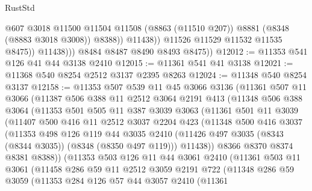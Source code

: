\begin{lexlean}{RustStd}
\begin{coremodule}
{\begin{coremodule}
{{{{{{{{{{{{{{{{{{{{{{{{{{{{{{{{{{{{{{{{{{{{{{{{{{                          @607
                          @3018
                          @11500
                          @11504
                          @11508
                          (@8863 (@11510 @207))
                          @8881
                          (@8348 (@8883 @3018 @3008))
                          @8388))
                      @11438))
                  @11526
                  @11529
                  @11532
                  @11535
                  @8475))
              @11438)))
        @8484
        @8487
        @8490
        @8493
        @8475))
@12012 := @11353 @541 @126 @41 @44 @3138 @2410
@12015 := @11361 @541 @41 @3138
@12021 := @11368 @540 @8254 @2512 @3137 @2395 @8263
@12024 := @11348 @540 @8254 @3137
@12158 := @11353
    @507
    @539
    @11
    @45
    @3066
    @3136
    (@11361
      @507
      @11
      @3066
      (@11387
        @506
        @388
        @11
        @2512
        @3064
        @2191
        @413
        (@11348
          @506
          @388
          @3064
          (@11353
            @501
            @505
            @11
            @387
            @3039
            @3063
            (@11361
              @501
              @11
              @3039
              (@11407
                @500
                @416
                @11
                @2512
                @3037
                @2204
                @423
                (@11348
                  @500
                  @416
                  @3037
                  (@11353
                    @498
                    @126
                    @119
                    @44
                    @3035
                    @2410
                    (@11426 @497 @3035 (@8343 (@8344 @3035)) (@8348 (@8350 @497 @119)))
                    @11438))
                @8366
                @8370
                @8374
                @8381
                @8388))
            (@11353
              @503
              @126
              @11
              @44
              @3061
              @2410
              (@11361
                @503
                @11
                @3061
                (@11458
                  @286
                  @59
                  @11
                  @2512
                  @3059
                  @2191
                  @722
                  (@11348
                    @286
                    @59
                    @3059
                    (@11353
                      @284
                      @126
                      @57
                      @44
                      @3057
                      @2410
                      (@11361
}}}}}}}}}}}}}}}}}}}}}}}}}}}}}}}}}}}}}}}}}}}}}}}}}}
\end{coremodule}}
\end{coremodule}
\end{lexlean}
